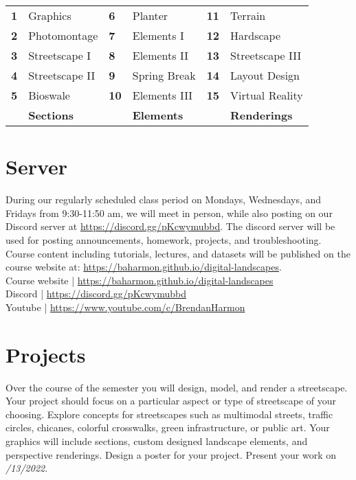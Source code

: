 \documentclass[11pt,article,oneside]{memoir}
\begin{document}
\begin{table}[H]
\begin{tabular}{l l @{\hskip 1.5cm} l l @{\hskip 1.5cm} l l}
\small
\textbf{1} & Graphics & \textbf{6} & Planter & \textbf{11} & Terrain\\
\textbf{2} & Photomontage & \textbf{7} & Elements I & \textbf{12} & Hardscape\\
\textbf{3} & Streetscape I & \textbf{8} & Elements II & \textbf{13} & Streetscape III\\
\textbf{4} & Streetscape II & \textbf{9} & Spring Break & \textbf{14} & Layout Design\\
\textbf{5} & Bioswale & \textbf{10} & Elements III & \textbf{15} & Virtual Reality \\[0.15cm]
& \textbf{Sections} && \textbf{Elements} && \textbf{Renderings}
\end{tabular}
\end{table}


\section{Server}

During our regularly scheduled class period
on Mondays, Wednesdays, and Fridays from 9:30-11:50 am,
we will meet in person, while also posting
on our Discord server at \url{https://discord.gg/pKcwymubbd}.
The discord server will be used for posting
announcements, homework, projects, and troubleshooting. 
Course content including tutorials, lectures, and datasets
will be published on the course website at:
\url{https://baharmon.github.io/digital-landscapes}.\\

\noindent
Course website | \url{https://baharmon.github.io/digital-landscapes}\\
Discord | \url{https://discord.gg/pKcwymubbd}\\
Youtube | \url{https://www.youtube.com/c/BrendanHarmon}\\

\section{Projects}

Over the course of the semester 
you will design, model, and render a streetscape.
Your project should focus on
a particular aspect or type of streetscape of your choosing. 
Explore concepts for streetscapes such as 
multimodal streets, traffic circles, chicanes,
colorful crosswalks,  green infrastructure, or public art.
Your graphics will include sections, 
custom designed landscape elements,
and perspective renderings.
Design a poster for your project. 
Present your work on 
\emph{/13/2022}.\\
\end{document}
